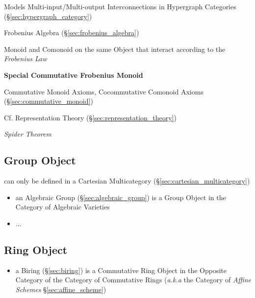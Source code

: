 Models Multi-input/Multi-output Interconnections in Hypergraph
Categories (\S\ref{sec:hypergraph_category})

\fist Frobenius Algebra (\S\ref{sec:frobenius_algebra})

Monoid and Comonoid on the same Object that interact according to the
\emph{Frobenius Law}


\textbf{Special Commutative Frobenius Monoid}

Commutative Monoid Axioms, Cocommutative Comonoid Axioms
(\S\ref{sec:commutative_monoid})

\fist Cf. Representation Theory (\S\ref{sec:representation_theory})

\emph{Spider Theorem}



\subsection{Group Object}\label{sec:group_object}

can only be defined in a Cartesian Multicategory
(\S\ref{sec:cartesian_multicategory})

\begin{itemize}
  \item an Algebraic Group (\S\ref{sec:algebraic_group}) is a Group Object in
    the Category of Algebraic Varieties
  \item ...
\end{itemize}



\subsection{Ring Object}\label{sec:ring_object}

\begin{itemize}
  \item a Biring (\S\ref{sec:biring}) is a Commutative Ring Object in the
    Opposite Category of the Category of Commutative Rings
    (\emph{a.k.a} the Category of \emph{Affine Schemes}
    \S\ref{sec:affine_scheme})
\end{itemize}



